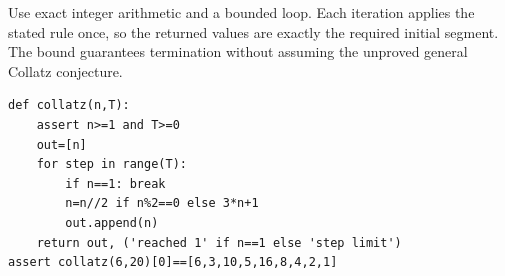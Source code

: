 Use exact integer arithmetic and a bounded loop. Each iteration applies the stated rule once, so the returned values are exactly the required initial segment. The bound guarantees termination without assuming the unproved general Collatz conjecture.\begin{verbatim}
def collatz(n,T):
    assert n>=1 and T>=0
    out=[n]
    for step in range(T):
        if n==1: break
        n=n//2 if n%2==0 else 3*n+1
        out.append(n)
    return out, ('reached 1' if n==1 else 'step limit')
assert collatz(6,20)[0]==[6,3,10,5,16,8,4,2,1]
\end{verbatim}

